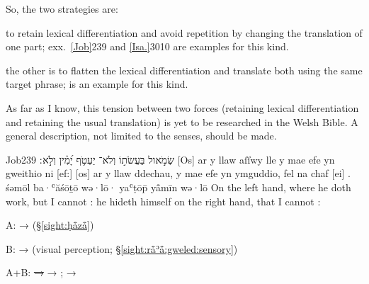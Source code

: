 \begin{enumerate}[A.]
		So, the two strategies are:

		As far as I know, this tension between two forces (retaining lexical differentiation and retaining the usual translation) is yet to be researched in the Welsh Bible. A general description, not limited to the senses, should be made.
\end{enumerate}

\begin{example}{Job}{23}{9}{}{}
	\quoling
	{שְׂמֹ֣אול בַּעֲשֹׂת֣וֹ וְלֹא־ יַעְטֹ֥ף יָ֝מִ֗ין וְלֹ֣א ׃}
	{[Os] ar y llaw aſſwy lle y mae efe yn gweithio ni  [ef:] [os] ar y llaw ddechau, y mae efe yn ymguddio, fel na chaf [ei] .}
	{śəmōl ba·ʿăśōṯō wə·lō· yaʿṭōp̄ yå̄mīn wə·lō }
	{On the left hand, where he doth work, but I cannot  : he hideth himself on the right hand, that I cannot  :}
\end{example}
\begin{compactdesc}
	\item[A:]  →  (§\ref{sight:ḥå̄zå̄})
	\item[B:]  →  (visual perception; §\ref{sight:rå̄ʾå̄:gweled:sensory})
	\item[A+B:]  \sout{→ } → ;  → 
\end{compactdesc}

